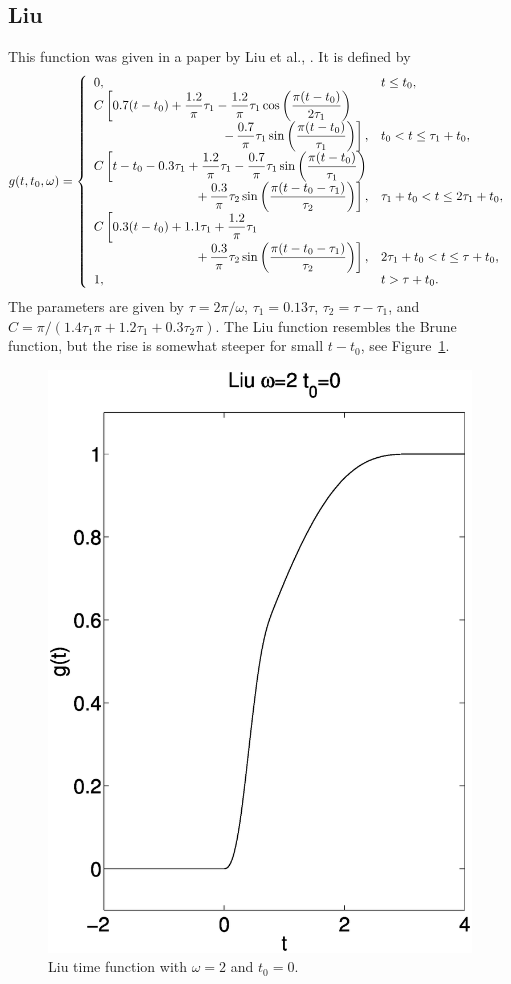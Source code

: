 \documentclass[11pt]{report}
\renewcommand{\arraystretch}{1.3}
\begin{document}
\subsection{Liu}
\renewcommand{\arraystretch}{1.5}
This function was given in a paper by Liu et al., \cite{liuetal_2006}. 
It is defined by 
\[
g(t,t_0,\omega) = \left\{ 
\begin{array}{ll}
  0, & t \leq t_0, \\
  C\left[0.7(t-t_0) + \dfrac{1.2}{\pi}\tau_1 - \dfrac{1.2}{\pi}\tau_1
  \cos\left(\dfrac{\pi (t-t_0)}{2\tau_1}\right) \right. & \\
     \hfill \left. -\,\dfrac{0.7}{\pi}\tau_1\sin\left(\dfrac{\pi (t-t_0)}{\tau_1}\right)\right],  & 
     t_0 < t \leq \tau_1+t_0, \\
%
  C\left[t-t_0-0.3\tau_1+\dfrac{1.2}{\pi}\tau_1-\dfrac{0.7}{\pi}\tau_1\sin\left(\dfrac{\pi
    (t-t_0)}{\tau_1}\right)\right. & \\ 
    \hfill
    \left. +\,\dfrac{0.3}{\pi}\tau_2\sin\left(\dfrac{\pi(t-t_0-\tau_1)}{\tau_2}\right)\right], &  
    \tau_1+t_0 < t \leq 2\tau_1+t_0, \\
%
  C\left[0.3(t-t_0)+1.1\tau_1+\dfrac{1.2}{\pi}\tau_1\right. & \\
    \hfill
    \left. +\,\dfrac{0.3}{\pi}\tau_2\sin\left(\dfrac{\pi(t-t_0-\tau_1)}{\tau_2}\right)\right], & 
    2\tau_1+t_0 < t \leq \tau+t_0, \\
  1,  &  t > \tau +t_0.
\end{array} \right.
\]
\noindent The parameters are given by $\tau=2\pi/\omega$, $\tau_1=0.13\tau$, $\tau_2 = \tau-\tau_1$,
and $C=\pi/(1.4\tau_1\pi+1.2\tau_1+0.3\tau_2\pi)$.  The Liu function resembles the Brune function,
but the rise is somewhat steeper for small $t-t_0$, see Figure~\ref{fig:liu}.
\begin{figure}
\begin{centering}
  \includegraphics[width=0.4\linewidth]{f12-liu.ps}
  \caption{Liu time function with $\omega=2$ and $t_0=0$.}
  \label{fig:liu}
\end{centering}
\end{figure}  
\end{document}
